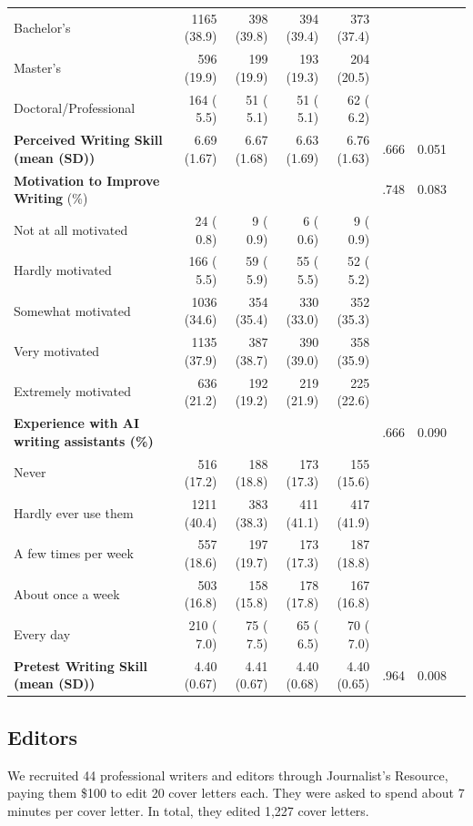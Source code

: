 \documentclass[11pt]{report}
\begin{document}
\begin{append}
\begin{table}
\begin{tabular}{lrrrrrrr}
   Bachelor's  &  1165 (38.9)  &   398 (39.8)  &   394 (39.4)  &   373 (37.4)  &  &    \\ 
   Master's  &   596 (19.9)  &   199 (19.9)  &   193 (19.3)  &   204 (20.5)  &  &    \\ 
   Doctoral/Professional  &   164 ( 5.5)  &    51 ( 5.1)  &    51 ( 5.1)  &    62 ( 6.2)    &  &  \\ 
\textbf{Perceived Writing Skill (mean (SD))} &  6.69 (1.67) &  6.67 (1.68) &  6.63 (1.69) &  6.76 (1.63) & .666 &    0.051 \\ 
\textbf{Motivation to Improve Writing} (\%) &   &    &    &    & .748 &    0.083 \\ 
   Not at all motivated &    24 ( 0.8)  &     9 ( 0.9)  &     6 ( 0.6)  &     9 ( 0.9)  &  &    \\ 
   Hardly motivated &   166 ( 5.5)  &    59 ( 5.9)  &    55 ( 5.5)  &    52 ( 5.2)  &  &    \\ 
   Somewhat motivated &  1036 (34.6)  &   354 (35.4)  &   330 (33.0)  &   352 (35.3)  &  &    \\ 
   Very motivated &  1135 (37.9)  &   387 (38.7)  &   390 (39.0)  &   358 (35.9)  &  &    \\ 
   Extremely motivated &   636 (21.2)  &   192 (19.2)  &   219 (21.9)  &   225 (22.6)  &  &    \\ 
\textbf{Experience with AI writing assistants (\%)} &   &    &    &    & .666 &   0.090 \\ 
   Never &   516 (17.2)  &   188 (18.8)  &   173 (17.3)  &   155 (15.6)  &    &  \\ 
   Hardly ever use them &  1211 (40.4)  &   383 (38.3)  &   411 (41.1)  &   417 (41.9)  &  &    \\ 
   A few times per week &   557 (18.6)  &   197 (19.7)  &   173 (17.3)  &   187 (18.8)  &  &    \\ 
   About once a week &   503 (16.8)  &   158 (15.8)  &   178 (17.8)  &   167 (16.8)  &  &    \\ 
   Every day &   210 ( 7.0)  &    75 ( 7.5)  &    65 ( 6.5)  &    70 ( 7.0)  &  &  &  \\ 
\textbf{Pretest Writing Skill (mean (SD))} &  4.40 (0.67) &  4.41 (0.67) &  4.40 (0.68) &  4.40 (0.65) & .964 &    0.008 \\ 
\bottomrule
\end{tabular}
\label{tab:s5randomization}
\end{table}

\subsection{Editors}\label{sec:editors}
We recruited 44 professional writers and editors through Journalist’s Resource, paying them \$100 to edit 20 cover letters each. They were asked to spend about 7 minutes per cover letter. In total, they edited 1,227 cover letters.


\end{append}
\end{document}

